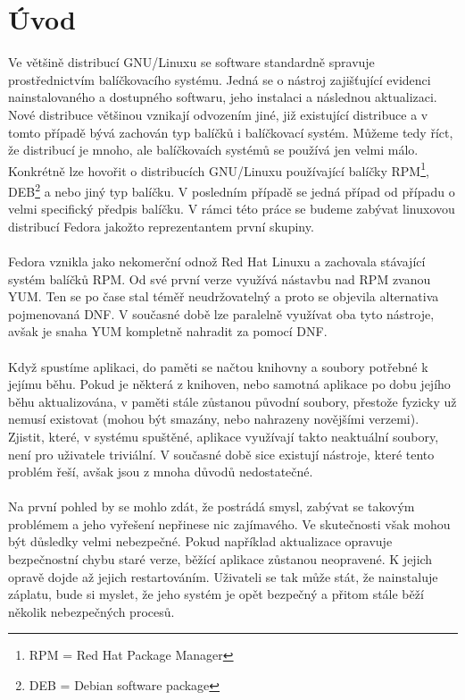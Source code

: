 \documentclass[10pt,a4paper]{article}
\begin{document}
	\section{Úvod}
		Ve většině distribucí GNU/Linuxu se software standardně spravuje prostřednictvím balíčkovacího systému. Jedná se o nástroj zajišťující evidenci nainstalovaného a dostupného softwaru, jeho instalaci a následnou aktualizaci. Nové distribuce většinou vznikají odvozením jiné, již existující distribuce a v tomto případě bývá zachován typ balíčků i balíčkovací systém. Můžeme tedy říct, že distribucí je mnoho, ale balíčkovaích systémů se používá jen velmi málo. Konkrétně lze hovořit o distribucích GNU/Linuxu používající balíčky RPM\footnote{RPM = Red Hat Package Manager}, DEB\footnote{DEB = Debian software package} a nebo jiný typ balíčku. V posledním případě se jedná případ od případu o velmi specifický předpis balíčku. V rámci této práce se budeme zabývat linuxovou distribucí Fedora jakožto reprezentantem první skupiny.
		\\
		\\
		Fedora vznikla jako nekomerční odnož Red Hat Linuxu a zachovala stávající systém balíčků RPM\@. Od své první verze využívá nástavbu nad RPM zvanou YUM\@. Ten se po čase stal téměř neudržovatelný a proto se objevila alternativa pojmenovaná DNF\@. V současné době lze paralelně využívat oba tyto nástroje, avšak je snaha YUM kompletně nahradit za pomocí DNF\@.
		\\
		\\
		Když spustíme aplikaci, do paměti se načtou knihovny a soubory potřebné k jejímu běhu. Pokud je některá z knihoven, nebo samotná aplikace po dobu jejího běhu aktualizována, v paměti stále zůstanou původní soubory, přestože fyzicky už nemusí existovat (mohou být smazány, nebo nahrazeny novějšími verzemi).
		\\
		Zjistit, které, v systému spuštěné, aplikace využívají takto neaktuální soubory, není pro uživatele triviální. V současné době sice existují nástroje, které tento problém řeší, avšak jsou z mnoha důvodů nedostatečné.
		\\
		\\
		Na první pohled by se mohlo zdát, že postrádá smysl, zabývat se takovým problémem a jeho vyřešení nepřinese nic zajímavého. Ve skutečnosti však mohou být důsledky velmi nebezpečné. Pokud například aktualizace opravuje bezpečnostní chybu staré verze, běžící aplikace zůstanou neopravené. K jejich opravě dojde až jejich restartováním. Uživateli se tak může stát, že nainstaluje záplatu, bude si myslet, že jeho systém je opět bezpečný a přitom stále běží několik nebezpečných procesů.
\end{document}
